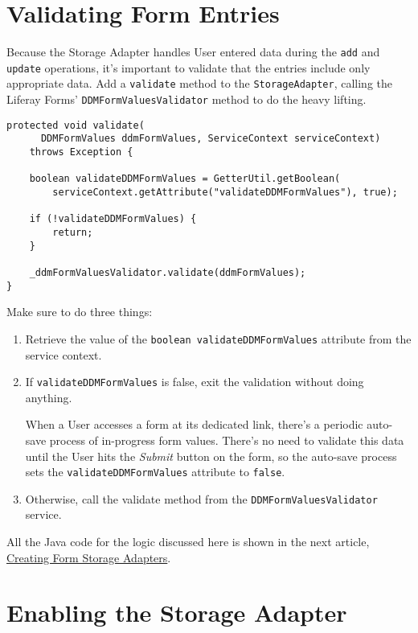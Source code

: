 \section{Validating Form Entries}\label{validating-form-entries}

Because the Storage Adapter handles User entered data during the
\texttt{add} and \texttt{update} operations, it's important to validate
that the entries include only appropriate data. Add a \texttt{validate}
method to the \texttt{StorageAdapter}, calling the Liferay Forms'
\texttt{DDMFormValuesValidator} method to do the heavy lifting.

\begin{verbatim}
protected void validate(
      DDMFormValues ddmFormValues, ServiceContext serviceContext)
    throws Exception {

    boolean validateDDMFormValues = GetterUtil.getBoolean(
        serviceContext.getAttribute("validateDDMFormValues"), true);

    if (!validateDDMFormValues) {
        return;
    }

    _ddmFormValuesValidator.validate(ddmFormValues);
}
\end{verbatim}

Make sure to do three things:

\begin{enumerate}
\def\labelenumi{\arabic{enumi}.}
\item
  Retrieve the value of the \texttt{boolean\ validateDDMFormValues}
  attribute from the service context.
\item
  If \texttt{validateDDMFormValues} is false, exit the validation
  without doing anything.

  When a User accesses a form at its dedicated link, there's a periodic
  auto-save process of in-progress form values. There's no need to
  validate this data until the User hits the \emph{Submit} button on the
  form, so the auto-save process sets the \texttt{validateDDMFormValues}
  attribute to \texttt{false}.
\item
  Otherwise, call the validate method from the
  \texttt{DDMFormValuesValidator} service.
\end{enumerate}

All the Java code for the logic discussed here is shown in the next
article,
\href{/docs/7-2/customization/-/knowledge_base/c/creating-a-form-storage-adapter}{Creating
Form Storage Adapters}.

\section{Enabling the Storage
Adapter}\label{enabling-the-storage-adapter}

